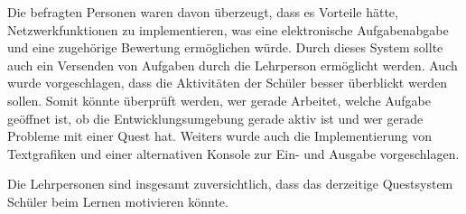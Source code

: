 Die befragten Personen waren davon überzeugt, dass es Vorteile hätte, Netzwerkfunktionen zu implementieren, was eine elektronische Aufgabenabgabe und eine zugehörige Bewertung ermöglichen würde. Durch dieses System sollte auch ein Versenden von Aufgaben durch die Lehrperson ermöglicht werden. Auch wurde vorgeschlagen, dass die Aktivitäten der Schüler besser überblickt werden sollen. Somit könnte überprüft werden, wer gerade Arbeitet, welche Aufgabe geöffnet ist, ob die Entwicklungsumgebung gerade aktiv ist und wer gerade Probleme mit einer Quest hat. Weiters wurde auch die Implementierung von Textgrafiken und einer alternativen Konsole zur Ein- und Ausgabe vorgeschlagen.

Die Lehrpersonen sind insgesamt zuversichtlich, dass das derzeitige Questsystem Schüler beim Lernen motivieren könnte.
